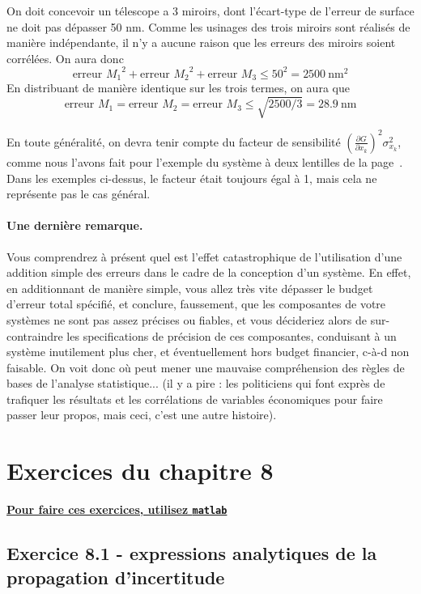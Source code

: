 On doit concevoir un télescope a 3 miroirs, dont l'écart-type de l'erreur de surface ne doit pas dépasser 50 nm. Comme les usinages des trois miroirs sont réalisés de manière indépendante, il n'y a aucune raison que les erreurs des miroirs soient corrélées. On aura donc
$$
\text{erreur $M_1$}^2+\text{erreur $M_2$}^2+\text{erreur $M_3$}\le 50^2=2500\ \text{nm}^2
$$
En distribuant de manière identique sur les trois termes, on aura que
$$
\text{erreur $M_1$}=\text{erreur $M_2$}=\text{erreur $M_3$}\le \sqrt{2500/3}=28.9\ \text{nm}
$$

En toute généralité, on devra tenir compte du facteur de sensibilité $\left(\frac{\partial G}{\partial x_k}\right)^2\sigma_{x_k}^2$, comme nous l'avons fait pour l'exemple du système à deux lentilles de la page~\pageref{sec:exopt}. Dans les exemples ci-dessus, le facteur était toujours égal à 1, mais cela ne représente pas le cas général.

\paragraph{Une dernière remarque.} Vous comprendrez à présent quel est l'effet catastrophique de l'utilisation d'une addition simple des erreurs dans le cadre de la conception d'un système. En effet, en additionnant de manière simple, vous allez très vite dépasser le budget d'erreur total spécifié, et conclure, faussement, que les composantes de votre systèmes ne sont pas assez précises ou fiables, et vous décideriez alors de sur-contraindre les specifications de précision de ces composantes, conduisant à un système inutilement plus cher, et éventuellement hors budget financier, c-à-d non faisable. On voit donc où peut mener une mauvaise compréhension des règles de bases de l'analyse statistique... (il y a pire : les politiciens qui font exprès de trafiquer les résultats et les corrélations de variables économiques pour faire passer leur propos, mais ceci, c'est une autre histoire).

\section{Exercices du chapitre 8}

\begin{center}
\Large \bf {\underline{Pour faire ces exercices, utilisez \texttt{matlab}}}
\end{center}

\subsection*{Exercice 8.1 - expressions analytiques de la propagation d'incertitude}

